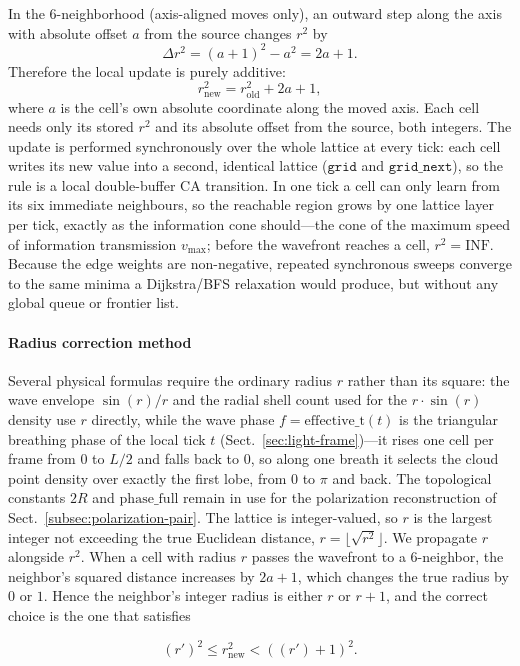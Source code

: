 \documentclass{ijuc}
\begin{document}
In the 6-neighborhood (axis-aligned moves only), an outward step along the axis with absolute offset $a$ from the source changes $r^{2}$ by
\[
\Delta r^{2}=(a+1)^{2}-a^{2}=2a+1.
\]
Therefore the local update is purely additive:
\[
r^{2}_{\text{new}}=r^{2}_{\text{old}}+2a+1,
\]
where $a$ is the cell's own absolute coordinate along the moved axis.  Each cell needs only its stored $r^{2}$ and its absolute offset from the source, both integers.  The update is performed synchronously over the whole lattice at every tick: each cell writes its new value into a second, identical lattice ($\texttt{grid}$ and $\texttt{grid\_next}$), so the rule is a local double-buffer CA transition.  In one tick a cell can only learn from its six immediate neighbours, so the reachable region grows by one lattice layer per tick, exactly as the information cone should---the cone of the maximum speed of information transmission $v_{\max}$; before the wavefront reaches a cell, $r^{2}=\mathrm{INF}$.  Because the edge weights are non-negative, repeated synchronous sweeps converge to the same minima a Dijkstra/BFS relaxation would produce, but without any global queue or frontier list.

\paragraph{Radius correction method}
Several physical formulas require the ordinary radius $r$ rather than its square: 
the wave envelope $\sin(r)/r$ 
and the radial shell count used for the $r\cdot\sin(r)$ density use $r$ directly, 
while the wave phase $f=\mathrm{effective\_t}(t)$ is the triangular breathing phase of the local tick $t$ (Sect.~\ref{sec:light-frame})---it rises one cell per frame from $0$ to $L/2$ and falls back to $0$, so along one breath it selects the cloud point density over exactly the first lobe, from $0$ to $\pi$ and back. 
The topological constants $2R$ and $\mathrm{phase\_full}$ remain in use for the polarization reconstruction of Sect.~\ref{subsec:polarization-pair}. 
The lattice is integer-valued, so $r$ is the largest integer not exceeding the true Euclidean distance, 
$r=\lfloor\sqrt{r^{2}}\rfloor$. 
We propagate $r$ alongside $r^{2}$. 
When a cell with radius $r$ passes the wavefront to a 6-neighbor, 
the neighbor's squared distance increases by $2a+1$, 
which changes the true radius by $0$ or $1$. 
Hence the neighbor's integer radius is either $r$ or $r+1$, 
and the correct choice is the one that satisfies


\[
(r')^{2}\le r^{2}_{\text{new}}<((r')+1)^{2}.
\]
\end{document}
